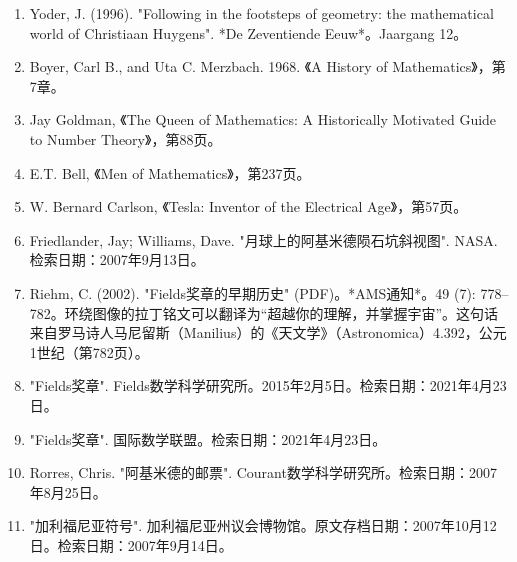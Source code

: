 \begin{enumerate}
\item Yoder, J. (1996). "Following in the footsteps of geometry: the mathematical world of Christiaan Huygens". *De Zeventiende Eeuw*。Jaargang 12。
\item Boyer, Carl B., and Uta C. Merzbach. 1968. 《A History of Mathematics》，第7章。
\item Jay Goldman, 《The Queen of Mathematics: A Historically Motivated Guide to Number Theory》，第88页。
\item E.T. Bell, 《Men of Mathematics》，第237页。
\item W. Bernard Carlson, 《Tesla: Inventor of the Electrical Age》，第57页。
\item Friedlander, Jay; Williams, Dave. "月球上的阿基米德陨石坑斜视图". NASA. 检索日期：2007年9月13日。
\item Riehm, C. (2002). "Fields奖章的早期历史" (PDF)。*AMS通知*。49 (7): 778–782。环绕图像的拉丁铭文可以翻译为“超越你的理解，并掌握宇宙”。这句话来自罗马诗人马尼留斯（Manilius）的《天文学》（Astronomica）4.392，公元1世纪（第782页）。
\item "Fields奖章". Fields数学科学研究所。2015年2月5日。检索日期：2021年4月23日。
\item "Fields奖章". 国际数学联盟。检索日期：2021年4月23日。
\item Rorres, Chris. "阿基米德的邮票". Courant数学科学研究所。检索日期：2007年8月25日。
\item "加利福尼亚符号". 加利福尼亚州议会博物馆。原文存档日期：2007年10月12日。检索日期：2007年9月14日。
\end{enumerate}

